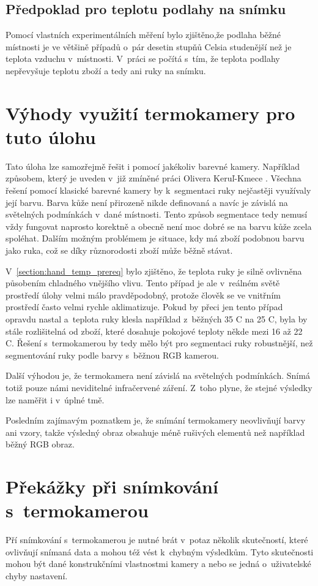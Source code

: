     \subsection{Předpoklad pro teplotu podlahy na snímku}
    Pomocí vlastních experimentálních měření bylo zjištěno,že podlaha běžné místnosti je ve většině případů o~pár desetin stupňů Celsia studenější než je teplota vzduchu v~místnosti. V~práci se počítá s~tím, že teplota podlahy nepřevyšuje teplotu zboží a tedy ani ruky na snímku.
    
\section{Výhody využití termokamery pro tuto úlohu}
Tato úloha lze samozřejmě řešit i pomocí jakékoliv barevné kamery. Například způsobem, který je uveden v~již zmíněné práci Olivera Keruľ-Kmece \cite{kerul2016detekce}. Všechna řešení pomocí klasické barevné kamery by k~segmentaci ruky nejčastěji využívaly její barvu. Barva kůže není přirozeně nikde definovaná a navíc je závislá na světelných podmínkách v~dané místnosti. Tento způsob segmentace tedy nemusí vždy fungovat naprosto korektně a obecně není moc dobré se na barvu kůže zcela spoléhat. Dalším možným problémem je situace, kdy má zboží podobnou barvu jako ruka, což se díky různorodosti zboží může běžně stávat. 

V~\ref{section:hand_temp_prereq} bylo zjištěno, že teplota ruky je silně ovlivněna působením chladného vnějšího vlivu. Tento případ je ale v~reálném světě prostředí úlohy velmi málo pravděpodobný, protože člověk se ve vnitřním prostředí často velmi rychle aklimatizuje. Pokud by přeci jen tento případ opravdu nastal a~teplota ruky klesla například z~běžných 35 \textdegree{}C na 25 \textdegree{}C, byla by stále rozlišitelná od zboží, které dosahuje pokojové teploty někde mezi 16 až 22 \textdegree{}C. Řešení s~termokamerou by tedy mělo být pro segmentaci ruky robustnější, než segmentování ruky podle barvy s~běžnou RGB kamerou.

Další výhodou je, že termokamera není závislá na světelných podmínkách. Snímá totiž pouze námi neviditelné infračervené záření. Z~toho plyne, že stejné výsledky lze naměřit i v~úplné tmě.

Posledním zajímavým poznatkem je, že snímání termokamery neovlivňují barvy ani vzory, takže výsledný obraz obsahuje méně rušivých elementů než například běžný RGB obraz.

\section{Překážky při snímkování s~termokamerou}
Pří snímkování s~termokamerou je nutné brát v~potaz několik skutečností, které ovlivňují snímaná data a mohou též vést k~chybným výsledkům. Tyto skutečnosti mohou být dané konstrukčními vlastnostmi kamery a nebo se  jedná o~uživatelské chyby nastavení.


